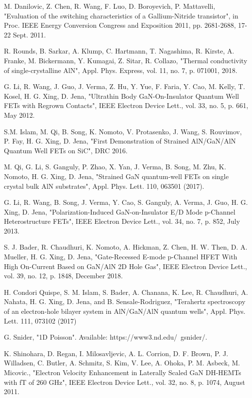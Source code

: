 \documentclass[journal]{IEEEtran}
\begin{document}
\begin{thebibliography}{00}

 M. Danilovic, Z. Chen, R. Wang, F. Luo, D. Boroyevich, P. Mattavelli, "Evaluation of the switching characteristics of a Gallium-Nitride transistor", in Proc. IEEE Energy Conversion Congress and Exposition 2011, pp. 2681-2688, 17-22 Sept. 2011.

 R. Rounds, B. Sarkar, A. Klump, C. Hartmann, T. Nagashima, R. Kirste, A. Franke, M. Bickermann, Y. Kumagai, Z. Sitar, R. Collazo, "Thermal conductivity of single-crystalline AlN", Appl. Phys. Express, vol. 11, no. 7, p. 071001, 2018.

 G. Li, R. Wang, J. Guo, J. Verma, Z. Hu, Y. Yue, F. Faria, Y. Cao, M. Kelly, T. Kosel, H. G. Xing, D. Jena, "Ultrathin Body GaN-On-Insulator Quantum Well FETs with Regrown Contacts",  IEEE Electron Device Lett., vol. 33, no. 5, p. 661, May 2012.

 S.M. Islam, M. Qi, B. Song, K. Nomoto, V. Protasenko, J. Wang, S. Rouvimov, P. Fay, H. G. Xing, D. Jena, "First Demonstration of Strained AlN/GaN/AlN Quantum Well FETs on SiC", DRC 2016.

 M. Qi, G. Li, S. Ganguly, P. Zhao, X. Yan, J. Verma, B. Song, M. Zhu, K. Nomoto, H. G. Xing, D. Jena, "Strained GaN quantum-well FETs on single crystal bulk AlN substrates", Appl. Phys. Lett. 110, 063501 (2017).

 G. Li, R. Wang, B. Song, J. Verma, Y. Cao, S. Ganguly, A. Verma, J. Guo, H. G. Xing, D. Jena, "Polarization-Induced GaN-on-Insulator E/D Mode p-Channel Heterostructure FETs", IEEE Electron Device Lett., vol. 34, no. 7, p. 852, July 2013.

 S. J. Bader, R. Chaudhuri, K. Nomoto, A. Hickman, Z. Chen, H. W. Then, D. A. Mueller, H. G. Xing, D. Jena, "Gate-Recessed E-mode p-Channel HFET With High On-Current Based on GaN/AlN 2D Hole Gas", IEEE Electron Device Lett., vol. 39, no. 12, p. 1848, December 2018.

 H. Condori Quispe, S. M. Islam, S. Bader, A. Chanana, K. Lee, R. Chaudhuri, A. Nahata, H. G. Xing, D. Jena, and B. Sensale-Rodriguez, "Terahertz spectroscopy of an electron-hole bilayer system in AlN/GaN/AlN quantum wells", Appl. Phys. Lett. 111, 073102 (2017)

 G. Snider, "1D Poisson".  Available: https://www3.nd.edu/~gsnider/.

 K. Shinohara, D. Regan, I. Milosavljevic, A. L. Corrion, D. F. Brown, P. J. Willadsen, C. Butler, A. Schmitz, S. Kim, V. Lee, A. Ohoka, P. M. Asbeck, M. Micovic., "Electron Velocity Enhancement in Laterally Scaled GaN DH-HEMTs with fT of 260 GHz", IEEE Electron Device Lett., vol. 32, no. 8, p. 1074, August 2011.


\end{thebibliography}
\end{document}

